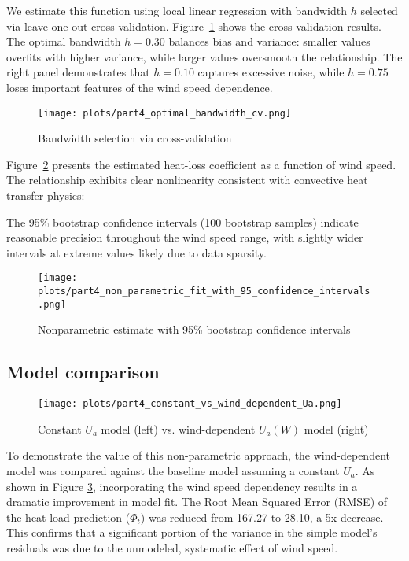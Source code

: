 \documentclass{article}
\begin{document}
We estimate this function using local linear regression with bandwidth $h$ selected via leave-one-out cross-validation. Figure~\ref{fig:part4_optimal_bandwidth_cv} shows the cross-validation results. The optimal bandwidth $h = 0.30$ balances bias and variance: smaller values overfits with higher variance, while larger values oversmooth the relationship. The right panel demonstrates that $h = 0.10$ captures excessive noise, while $h = 0.75$ loses important features of the wind speed dependence.

\begin{figure}[H]
    \centering
    \texttt{[image: plots/part4\_optimal\_bandwidth\_cv.png]}
    \caption{Bandwidth selection via cross-validation}
    \label{fig:part4_optimal_bandwidth_cv}
\end{figure}


Figure~\ref{fig:part4_non_parametric_fit_with_95_confidence_intervals} presents the estimated heat-loss coefficient as a function of wind speed. The relationship exhibits clear nonlinearity consistent with convective heat transfer physics:

The 95\% bootstrap confidence intervals (100 bootstrap samples) indicate reasonable precision throughout the wind speed range, with slightly wider intervals at extreme values likely due to data sparsity.

\begin{figure}[H]
    \centering
    \texttt{[image: plots/part4\_non\_parametric\_fit\_with\_95\_confidence\_intervals.png]}
    \caption{Nonparametric estimate with 95\% bootstrap confidence intervals}
    \label{fig:part4_non_parametric_fit_with_95_confidence_intervals}
\end{figure}

\subsection{Model comparison}

\begin{figure}[H]
    \centering
    \texttt{[image: plots/part4\_constant\_vs\_wind\_dependent\_Ua.png]}
    \caption{Constant $U_a$ model (left) vs. wind-dependent $U_a(W)$ model (right)}
    \label{fig:part4_constant_vs_wind_dependent_Ua}
\end{figure}

To demonstrate the value of this non-parametric approach, the wind-dependent model was compared against the baseline model assuming a constant $U_a$. As shown in Figure \ref{fig:part4_constant_vs_wind_dependent_Ua}, incorporating the wind speed dependency results in a dramatic improvement in model fit. The Root Mean Squared Error (RMSE) of the heat load prediction ($\Phi_t$) was reduced from 167.27 to 28.10, a 5x decrease. This confirms that a significant portion of the variance in the simple model's residuals was due to the unmodeled, systematic effect of wind speed.
\end{document}
